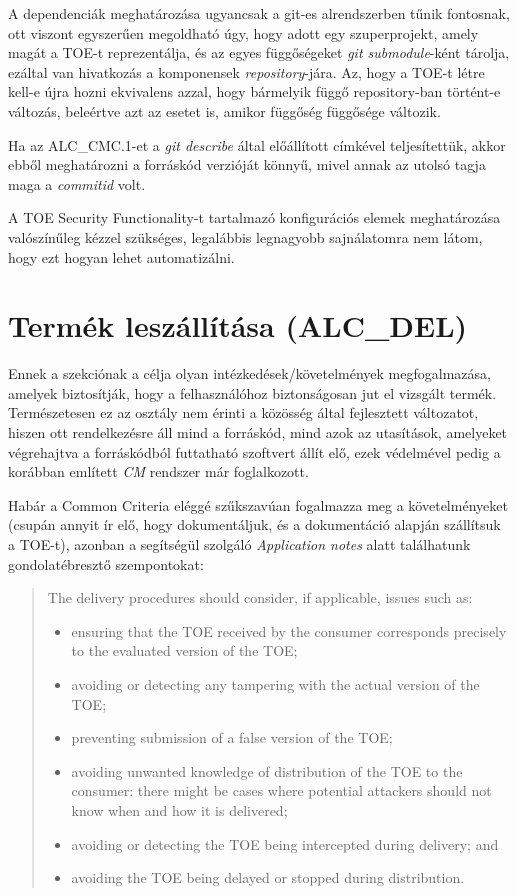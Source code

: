 A dependenciák meghatározása ugyancsak a git-es alrendszerben tűnik fontosnak, ott viszont
egyszerűen megoldható úgy, hogy adott egy szuperprojekt, amely magát a TOE-t reprezentálja, és
az egyes függőségeket \emph{git submodule}-ként tárolja, ezáltal van hivatkozás a komponensek
\emph{repository}-jára. Az, hogy a TOE-t létre kell-e újra hozni ekvivalens azzal, hogy bármelyik
függő repository-ban történt-e változás, beleértve azt az esetet is, amikor függőség függősége
változik.

Ha az ALC\_CMC.1-et a \emph{git describe} által előállított címkével teljesítettük, akkor ebből
meghatározni a forráskód verzióját könnyű, mivel annak az utolsó tagja maga a \emph{commitid}
volt.

A TOE Security Functionality-t tartalmazó konfigurációs elemek meghatározása valószínűleg kézzel
szükséges, legalábbis legnagyobb sajnálatomra nem látom, hogy ezt hogyan lehet automatizálni.

\pagebreak[2]
\section{Termék leszállítása (ALC\_DEL)}

Ennek a szekciónak a célja olyan intézkedések/követelmények megfogalmazása, amelyek biztosítják,
hogy a felhasználóhoz biztonságosan jut el vizsgált termék. Természetesen ez az osztály nem érinti a
közösség által fejlesztett változatot, hiszen ott rendelkezésre áll mind a forráskód, mind azok az
utasítások, amelyeket végrehajtva a forráskódból futtatható szoftvert állít elő, ezek védelmével
pedig a korábban említett \emph{CM} rendszer már foglalkozott.

Habár a Common Criteria eléggé szűkszavúan fogalmazza meg a követelményeket (csupán annyit ír elő,
hogy dokumentáljuk, és a dokumentáció alapján szállítsuk a TOE-t), azonban a segítségül szolgáló
\emph{Application notes} alatt találhatunk gondolatébresztő szempontokat:

\begin{quote}
    The delivery procedures should consider, if applicable, issues such as:
    \begin{itemize}
        \item ensuring that the TOE received by the consumer corresponds precisely to the evaluated
            version of the TOE;
        \item avoiding or detecting any tampering with the actual version of the TOE;
        \item preventing submission of a false version of the TOE;
        \item avoiding unwanted knowledge of distribution of the TOE to the consumer: there might be
            cases where potential attackers should not know when and how it is delivered;
        \item avoiding or detecting the TOE being intercepted during delivery; and
        \item avoiding the TOE being delayed or stopped during distribution.
    \end{itemize}
\end{quote}

